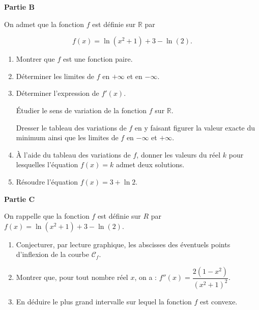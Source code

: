 \documentclass[10pt,a4paper]{article}
\newcommand{\R}{\mathbb{R}}
\begin{document}
\textbf{Partie B}

\medskip

On admet que la fonction $f$ est définie sur $\R$ par 

\[f(x) = \ln \left(x^2 + 1\right) + 3 - \ln (2).\]

\medskip

\begin{enumerate}
\item Montrer que $f$ est une fonction paire.
\item Déterminer les limites de $f$ en $+\infty$ et en $-\infty$.
\item Déterminer l'expression de $f'(x)$.

Étudier le sens de variation de la fonction $f$ sur $\R$.

Dresser le tableau des variations de $f$ en y faisant figurer la valeur exacte du minimum ainsi que les limites de $f$ en $-\infty$ et $+\infty$.
\item À l'aide du tableau des variations de $f$, donner les valeurs du réel $k$ pour lesquelles l'équation $f(x) = k$ admet deux solutions.
\item Résoudre l'équation $f(x) = 3 + \ln 2$.
\end{enumerate}

\bigskip

\textbf{Partie C}

\medskip

On rappelle que la fonction $f$ est définie sur $R$ par $f(x) = \ln \left(x^2 + 1\right) + 3 - \ln (2)$.

\medskip

\begin{enumerate}
\item Conjecturer, par lecture graphique, les abscisses des éventuels points d'inflexion
de la courbe $\mathcal{C}_f$.
\item Montrer que, pour tout nombre réel $x$, on a : $f''(x) = \dfrac{2\left(1 - x^2\right)}{\left(x^2 + 1\right)^2}$.
\item En déduire le plus grand intervalle sur lequel la fonction $f$ est convexe.
\end{enumerate}

\newpage
\end{document}
